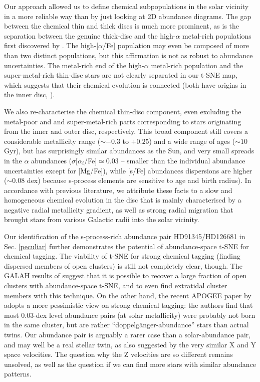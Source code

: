 \documentclass{aa}  %
\begin{document}
Our approach allowed us to define chemical subpopulations in the solar vicinity in a more reliable way than by just looking at 2D abundance diagrams. The gap between the chemical thin and thick discs is much more prominent, as is the separation between the genuine thick-disc and the high-$\alpha$ metal-rich populations first discovered by \citet{Adibekyan2011}. The high-[$\alpha$/Fe] population may even be composed of more than two distinct populations, but this affirmation is not as robust to abundance uncertainties. The metal-rich end of the high-$\alpha$ metal-rich population and the super-metal-rich thin-disc stars are not clearly separated in our t-SNE map, which suggests that their chemical evolution is connected (both have origins in the inner disc, \citealt[][see also Chiappini et al., in prep.]{Adibekyan2012, Haywood2018}). 

We also re-characterise the chemical thin-disc component, even excluding the metal-poor and and super-metal-rich parts corresponding to stars originating from the inner and outer disc, respectively. This broad component still covers a considerable metallicity range ($\sim-0.3$ to $+0.25$) and a wide range of ages ($\sim10$ Gyr), but has surprisingly similar abundances as the Sun, and very small spreads in the $\alpha$ abundances ($\sigma[\alpha_i$/Fe]$\simeq0.03$ -- smaller than the individual abundance uncertainties except for [Mg/Fe]), while [s/Fe] abundances dispersions are higher ($\sim0.08$ dex) because s-process elements are sensitive to age and birth radius). In accordance with previous literature, we attribute these facts to a slow and homogeneous chemical evolution in the disc that is mainly characterised by a negative radial metallicity gradient, as well as strong radial migration that brought stars from various Galactic radii into the solar vicinity.

Our identification of the s-process-rich abundance pair HD91345/HD126681 in Sec. \ref{peculiar} further demonstrates the potential of abundance-space t-SNE for chemical tagging. The viability of t-SNE for strong chemical tagging (finding dispersed members of open clusters) is still not completely clear, though. The GALAH results of \citet{Kos2018} suggest that it is possible to recover a large fraction of open clusters with abundance-space t-SNE, and to even find extratidal cluster members with this technique. On the other hand, the recent APOGEE paper by \citet{Ness2018} adopts a more pessimistic view on strong chemical tagging: the authors find that most 0.03-dex level abundance pairs (at solar metallicity) were probably not born in the same cluster, but are rather ``doppelg\"anger-abundance'' stars than actual twins. Our abundance pair is arguably a rarer case than a solar-abundance pair, and may well be a real stellar twin, as also suggested by the very similar X and Y space velocities. The question why the Z velocities are so different remains unsolved, as well as the question if we can find more stars with similar abundance patterns.
\end{document}
